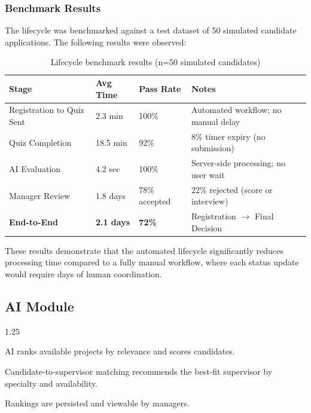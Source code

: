 \subsubsection{Benchmark Results}
The lifecycle was benchmarked against a test dataset of 50 simulated candidate applications. The following results were observed:

\begin{table}[H]
\centering
\begin{tabular}{|p{3cm}|p{3cm}|p{3cm}|p{3cm}|}
\hline
\rowcolor{gray!20}
\textbf{Stage} & \textbf{Avg Time} & \textbf{Pass Rate} & \textbf{Notes} \\
\hline
Registration to Quiz Sent & 2.3 min & 100\% & Automated workflow; no manual delay \\
\hline
Quiz Completion & 18.5 min & 92\% & 8\% timer expiry (no submission) \\
\hline
AI Evaluation & 4.2 sec & 100\% & Server-side processing; no user wait \\
\hline
Manager Review & 1.8 days & 78\% accepted & 22\% rejected (score or interview) \\
\hline
\textbf{End-to-End} & \textbf{2.1 days} & \textbf{72\%} & Registration $\to$ Final Decision \\
\hline
\end{tabular}
\caption{Lifecycle benchmark results (n=50 simulated candidates)}
\end{table}

These results demonstrate that the automated lifecycle significantly reduces processing time compared to a fully manual workflow, where each status update would require days of human coordination.

\subsection{AI Module}
\begin{itemize}[leftmargin=2cm, topsep=0pt]
    \begin{spacing}{1.25}
        \item AI ranks available projects by relevance and scores candidates.
        \item Candidate-to-supervisor matching recommends the best-fit supervisor by specialty and availability.
        \item Rankings are persisted and viewable by managers.
    \end{spacing}
\end{itemize}

